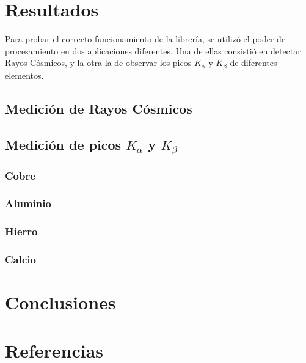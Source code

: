\documentclass[twoside,twocolumn]{article}
\begin{document}
    
  \section{Resultados}
  Para probar el correcto funcionamiento de la librería, se utilizó el poder de procesamiento en dos aplicaciones diferentes.
  Una de ellas consistió en detectar Rayos Cósmicos, y la otra la de observar los picos $K_{\alpha}$ y $K_{\beta}$ de diferentes elementos.
    
  \subsection{Medición de Rayos Cósmicos}

  \subsection{Medición de picos $K_{\alpha}$ y $K_{\beta}$}

  \subsubsection{Cobre}

  \subsubsection{Aluminio}

  \subsubsection{Hierro}

  \subsubsection{Calcio}
    
  \section{Conclusiones}
    
  

  \section{Referencias}\label{}
    
\end{document}
